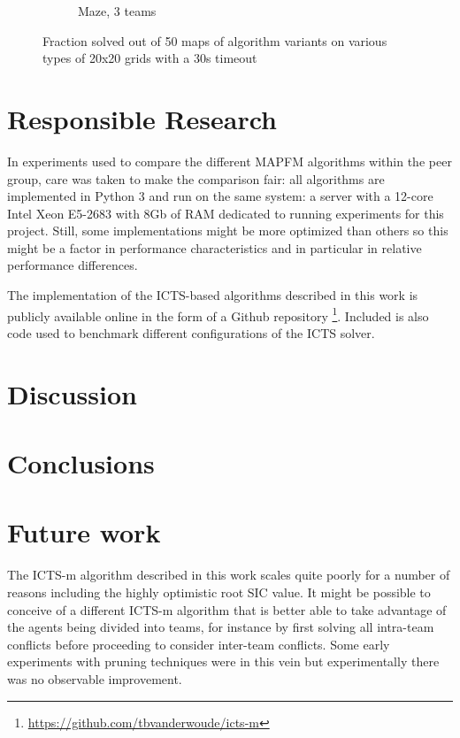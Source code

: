 \documentclass[english]{article}
\begin{document}
\begin{figure}
\begin{subfigure}{0.49\textwidth}
		\caption{Maze, 3 teams}
		\label{fig:m3}
	\end{subfigure}
	\caption{Fraction solved out of 50 maps of algorithm variants on various types of 20x20 grids with a 30s timeout}
	\label{fig:bottom}
\end{figure}
	\section{Responsible Research}
	In experiments used to compare the different MAPFM algorithms within the peer group, care was taken to make the comparison fair: all algorithms are implemented in Python 3 and run on the same system: a server with a 12-core Intel Xeon E5-2683 with 8Gb of RAM dedicated to running experiments for this project. Still, some implementations might be more optimized than others so this might be a factor in performance characteristics and in particular in relative performance differences.
	
	The implementation of the ICTS-based algorithms described in this work is publicly available online in the form of a Github repository \footnote{\url{https://github.com/tbvanderwoude/icts-m}}. Included is also code used to benchmark different configurations of the ICTS solver.
	
	\section{Discussion}
	\section{Conclusions}
	
	\section{Future work}
	The ICTS-m algorithm described in this work scales quite poorly for a number of reasons including the highly optimistic root SIC value. It might be possible to conceive of a different ICTS-m algorithm that is better able to take advantage of the agents being divided into teams, for instance by first solving all intra-team conflicts before proceeding to consider inter-team conflicts. Some early experiments with pruning techniques were in this vein but experimentally there was no observable improvement.
	\printbibliography
	
\end{document}
